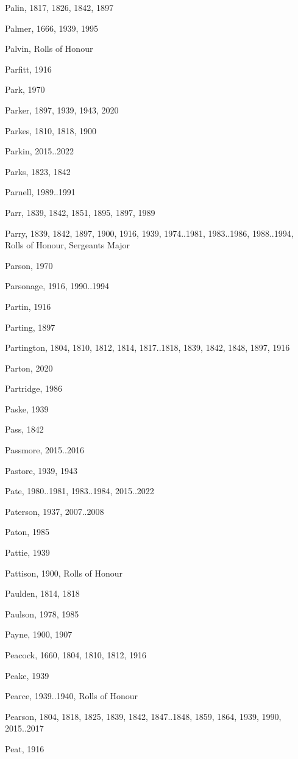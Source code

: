 {\begin{theindex}
\item Palin, 1817, 1826, 1842, 1897
\item Palmer, 1666, 1939, 1995
\item Palvin, Rolls of Honour
\item Parfitt, 1916
\item Park, 1970
\item Parker, 1897, 1939, 1943, 2020
\item Parkes, 1810, 1818, 1900
\item Parkin, 2015..2022
\item Parks, 1823, 1842
\item Parnell, 1989..1991
\item Parr, 1839, 1842, 1851, 1895, 1897, 1989
\item Parry, 1839, 1842, 1897, 1900, 1916, 1939, 1974..1981, 1983..1986, 1988..1994, Rolls of Honour, Sergeants Major
\item Parson, 1970
\item Parsonage, 1916, 1990..1994
\item Partin, 1916
\item Parting, 1897
\item Partington, 1804, 1810, 1812, 1814, 1817..1818, 1839, 1842, 1848, 1897, 1916
\item Parton, 2020
\item Partridge, 1986
\item Paske, 1939
\item Pass, 1842
\item Passmore, 2015..2016
\item Pastore, 1939, 1943
\item Pate, 1980..1981, 1983..1984, 2015..2022
\item Paterson, 1937, 2007..2008
\item Paton, 1985
\item Pattie, 1939
\item Pattison, 1900, Rolls of Honour
\item Paulden, 1814, 1818
\item Paulson, 1978, 1985
\item Payne, 1900, 1907
\item Peacock, 1660, 1804, 1810, 1812, 1916
\item Peake, 1939
\item Pearce, 1939..1940, Rolls of Honour
\item Pearson, 1804, 1818, 1825, 1839, 1842, 1847..1848, 1859, 1864, 1939, 1990, 2015..2017
\item Peat, 1916

\end{theindex}}

